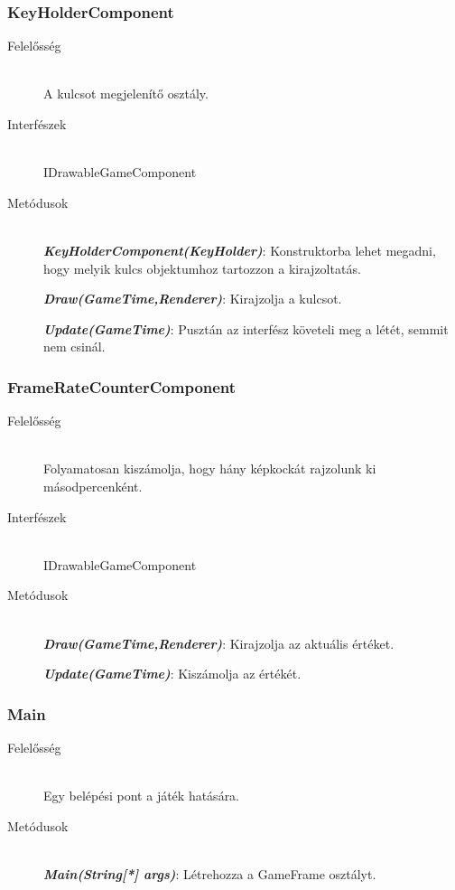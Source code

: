 \subsubsection{KeyHolderComponent}
	\begin{description}
		\item[Felelősség] \hfill \\
		A kulcsot megjelenítő osztály.
		\item[Interfészek] \hfill \\
		IDrawableGameComponent

		\item[Metódusok] \hfill \\
		\textbf{\emph{KeyHolderComponent(KeyHolder)}}: Konstruktorba lehet megadni, hogy melyik kulcs objektumhoz tartozzon a kirajzoltatás.

		\textbf{\emph{Draw(GameTime,Renderer)}}: Kirajzolja a kulcsot.

		\textbf{\emph{Update(GameTime)}}: Pusztán az interfész követeli meg a létét, semmit nem csinál.
	\end{description}
	
\subsubsection{FrameRateCounterComponent}
	\begin{description}
		\item[Felelősség] \hfill \\
		Folyamatosan kiszámolja, hogy hány képkockát rajzolunk ki másodpercenként.
		\item[Interfészek] \hfill \\
		IDrawableGameComponent

		\item[Metódusok] \hfill \\
		\textbf{\emph{Draw(GameTime,Renderer)}}: Kirajzolja az aktuális értéket.

		\textbf{\emph{Update(GameTime)}}: Kiszámolja az értékét.
	\end{description}



\subsubsection{Main}
	\begin{description}
	\item[Felelősség] \hfill \\
	Egy belépési pont a játék hatására.
	\item[Metódusok] \hfill \\
	\textbf{\emph{Main(String[*] args)}}: Létrehozza a GameFrame osztályt.
	\end{description}
	
